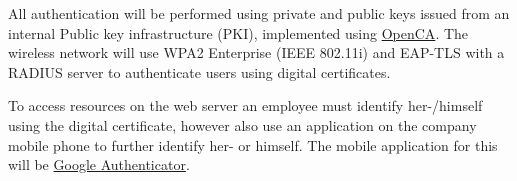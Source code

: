 All authentication will be performed using private and public keys issued from an internal Public key infrastructure (PKI), implemented using \href{https://pki.openca.org/}{OpenCA}. The wireless network will use WPA2 Enterprise (IEEE 802.11i) and EAP-TLS with a RADIUS server to authenticate users using digital certificates.

To access resources on the web server an employee must identify her-/himself using the digital certificate, however also use an application on the company mobile phone to further identify her- or himself. The mobile application for this will be \href{http://en.wikipedia.org/wiki/Google_Authenticator}{Google Authenticator}.
